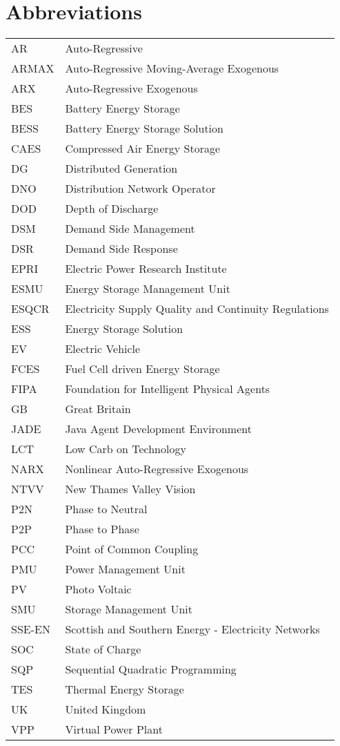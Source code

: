 \chapter*{Abbreviations}


\begin{table*}[hbt]
  \begin{tabular}{l l}
    AR & Auto-Regressive\\
    ARMAX & Auto-Regressive Moving-Average Exogenous\\
    ARX & Auto-Regressive Exogenous\\
    BES & Battery Energy Storage\\
    BESS & Battery Energy Storage Solution\\
    CAES & Compressed Air Energy Storage\\
    DG & Distributed Generation\\
    DNO & Distribution Network Operator\\
    DOD & Depth of Discharge\\
    DSM & Demand Side Management\\
    DSR & Demand Side Response\\
    EPRI & Electric Power Research Institute\\
    ESMU & Energy Storage Management Unit\\
    ESQCR & Electricity Supply Quality and Continuity Regulations\\
    ESS & Energy Storage Solution\\
    EV & Electric Vehicle\\
    FCES & Fuel Cell driven Energy Storage\\
    FIPA & Foundation for Intelligent Physical Agents\\
    GB & Great Britain\\
    JADE & Java Agent Development Environment\\
    LCT & Low Carb on Technology\\
    NARX & Nonlinear Auto-Regressive Exogenous\\
    NTVV & New Thames Valley Vision\\
    P2N & Phase to Neutral\\
    P2P & Phase to Phase\\
    PCC & Point of Common Coupling\\
    PMU & Power Management Unit\\
    PV & Photo Voltaic\\
    SMU & Storage Management Unit\\
    SSE-EN & Scottish and Southern Energy - Electricity Networks\\
    SOC & State of Charge\\
    SQP & Sequential Quadratic Programming\\
    TES & Thermal Energy Storage\\
    UK & United Kingdom\\
    VPP & Virtual Power Plant
  \end{tabular}
\end{table*}
